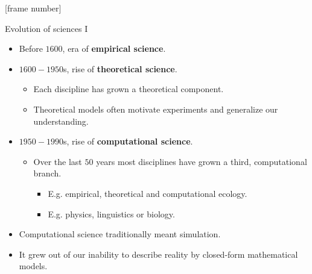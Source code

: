 \documentclass[aspectratio=169,t]{beamer}
\begin{document}
  {
    [frame number]
    \begin{frame}{Evolution of sciences I}
        \begin{itemize}
            \item Before $1600$, era of \textbf{empirical science}.
            \item $1600-1950$s, rise of \textbf{theoretical science}.
                  \begin{itemize}
                      \item Each discipline has grown a theoretical component.
                      \item Theoretical models often motivate experiments and generalize our understanding.
                  \end{itemize}
            \item $1950-1990$s, rise of \textbf{computational science}.
                  \begin{itemize}
                      \item Over the last $50$ years most disciplines have grown a third, computational branch.
                      \begin{itemize}
                          \item E.g. empirical, theoretical and computational ecology.
                          \item E.g. physics, linguistics or biology.
                      \end{itemize}
                  \end{itemize}
            \item Computational science traditionally meant simulation.
            \item It grew out of our inability to describe reality by closed-form mathematical models.
        \end{itemize}
    \end{frame}
  }
\end{document}
